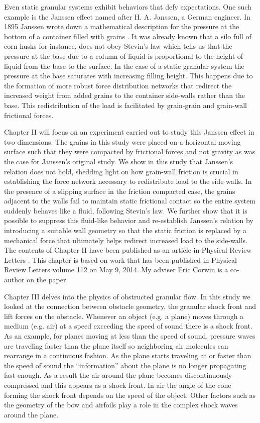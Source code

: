 Even static granular systems exhibit behaviors that defy expectations. One such example is the Janssen effect named after H. A. Janssen, a German engineer. In 1895 Janssen wrote down a mathematical description for the pressure at the bottom of a container filled with grains \cite{janssen_versuche_1895}. It was already known that a silo full of corn husks for instance, does not obey Stevin's law which tells us that the pressure at the base due to a column of liquid is proportional to the height of liquid from the base to the surface. In the case of a static granular system the pressure at the base saturates with increasing filling height. This happens due to the formation of more robust force distribution networks that redirect the increased weight from added grains to the container side-walls rather than the base. This redistribution of the load is facilitated by grain-grain and grain-wall frictional forces. 

Chapter II will focus on an experiment carried out to study this Janssen effect in two dimensions. The grains in this study were placed on a horizontal moving surface such that they were compacted by frictional forces and not gravity as was the case for Janssen's original study. We show in this study that Janssen's relation does not hold, shedding light on how grain-wall friction is crucial in establishing the force network necessary to redistribute load to the side-walls. In the presence of a slipping surface in the friction compacted case, the grains adjacent to the walls fail to maintain static frictional contact so the entire system suddenly behaves like a fluid, following Stevin's law. We further show that it is possible to suppress this fluid-like behavior and re-establish Janssen's relation by introducing a suitable wall geometry so that the static friction is replaced by a mechanical force that ultimately helps redirect increased load to the side-walls. The contents of Chapter II have been published as an article in Physical Review Letters \cite{karim_corwin}. This chapter is based on work that has been published in Physical Review Letters volume 112 on May 9, 2014. My adviser Eric Corwin is a co-author on the paper. 

Chapter III delves into the physics of obstructed granular flow. In this study we looked at the connection between obstacle geometry, the granular shock front and lift forces on the obstacle. Whenever an object (e.g. a plane) moves through a medium (e.g. air) at a speed exceeding the speed of sound there is a shock front. As an example, for planes moving at less than the speed of sound, pressure waves are traveling faster than the plane itself so neighboring air molecules can rearrange in a continuous fashion. As the plane starts traveling at or faster than the speed of sound the “information” about the plane is no longer propagating fast enough. As a result the air around the plane becomes discontinuously compressed and this appears as a shock front. In air the angle of the cone forming the shock front depends on the speed of the object. Other factors such as the geometry of the bow and airfoils play a role in the complex shock waves around the plane. 

